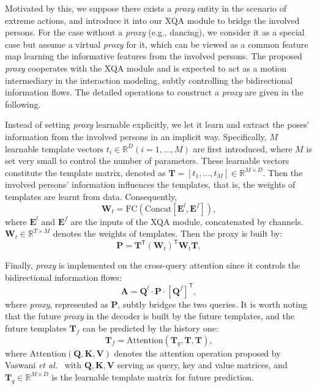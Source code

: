 \documentclass[10pt,twocolumn,letterpaper]{article}
\begin{document}
Motivated by this, we suppose there exists a \textit{proxy} entity in the scenario of extreme actions, and introduce it into our XQA module to bridge the involved persons.
For the case without a \textit{proxy} (e.g., dancing), we consider it as a special case but assume a virtual \textit{proxy} for it, which can be viewed as a common feature map learning the informative features from the involved persons. 
The proposed \textit{proxy} cooperates with the XQA module and is expected to act as a motion intermediary in the interaction modeling, subtly controlling the bidirectional information flows.
The detailed operations to construct a \textit{proxy} are given in the following.


Instead of setting \textit{proxy} learnable explicitly, we let it learn and extract the poses' information from the involved persons in an implicit way. 
Specifically, $M$ learnable template vectors $t_i\in \mathbb{R}^{D} (i=1,\dots, M)$ are first introduced, where $M$ is set very small to control the number of parameters. 
These learnable vectors constitute the template matrix, denoted as $\bm{T}=[t_1, \dots, t_M] \in \mathbb{R}^{M \times D}$. 
Then the involved persons' information influences the templates, that is, the weights of templates are learnt from data. Consequently, 
\vskip -0.1in
\begin{equation}\label{eq:temp_w}
    \bm{W}_t = \text{FC}(\text{Concat}[\bm{E}^l, \bm{E}^f]), 
\end{equation}
where $\bm{E}^l$ and $\bm{E}^f$ are the inputs of the XQA module, concatenated by channels. 
$\bm{W}_t \in \mathbb{R}^{T \times M}$ denotes the weights of templates.
Then the proxy is built by: 
\vskip -0.05in
\begin{equation}\label{eq:proxy}
    \bm{P} = \bm{T}^{\mathsf{T}} (\bm{W}_t)^{\mathsf{T}} \bm{W}_t  \bm{T} , 
\end{equation}

Finally, \textit{proxy} is implemented on the cross-query attention since it controls the bidirectional information flows:
\vskip -0.1in
\begin{equation} \label{eq:proxy_attn}
    \bm{A} = \bm{Q}^l \cdot \bm{P} \cdot [\bm{Q}^f]^{\mathsf{T}}, 
\end{equation}
where \textit{proxy}, represented as $\bm{P}$, subtly bridges the two queries.
It is worth noting that the future \textit{proxy} in the decoder is built by the future templates, and the future templates $\bm{T}_f$ can be predicted by the history one: 
\vskip -0.1in 
\begin{equation} \label{eq:future_temp}
    \bm{T}_f = \text{Attention} (\bm{T}_q, \bm{T}, \bm{T}),
\end{equation}
where $\text{Attention} (\bm{Q}, \bm{K}, \bm{V})$ denotes the attention operation proposed by Vaswani \textit{et al.}~\cite{vaswani2017attention} with $\bm{Q}, \bm{K}, \bm{V}$ serving as query, key and value matrices, 
and $\bm{T}_q \in\mathbb{R}^{M \times D}$ is the learnable template matrix for future prediction. 
\end{document}
